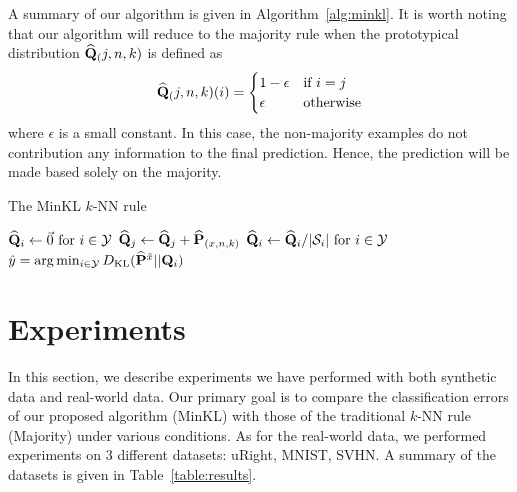 \documentclass{article}
\begin{document}
A summary of our algorithm is given in Algorithm~\ref{alg:minkl}.
It is worth noting that our algorithm will reduce to the majority
rule when the prototypical distribution
$\widehat{\mathbf{Q}}_(j,n,k)$ is defined as 
\[
\widehat{\mathbf{Q}}_(j,n,k)(i) = \begin{cases} 1-\epsilon &\mbox{if } i = j \\ 
\epsilon & \mbox{otherwise} \end{cases}
\]
where $\epsilon$ is a small constant. In this case, the non-majority
examples do not contribution any information to the final
prediction. Hence, the prediction will be made based solely on the
majority.

\begin{algorithm}
\caption{The MinKL $k$-NN rule}
\label{alg:minkl}
\begin{algorithmic}[1]
\STATE $\widehat{\mathbf{Q}}_i \leftarrow \vec{0} \mbox{ for } i \in \mathcal{Y}$
\STATE $\widehat{\mathbf{Q}}_j \leftarrow \widehat{\mathbf{Q}}_j + \widehat{\mathbf{P}}_{(x,n,k)}$
\ENDFOR
\STATE $\widehat{\mathbf{Q}}_i \leftarrow \widehat{\mathbf{Q}}_i / |\mathcal{S}_i| \mbox{ for } i \in \mathcal{Y}$
\STATE $\hat{y} = \arg\min_{i \in \mathcal{Y}} D_{\mathrm{KL}}(\widehat{\mathbf{P}}^{\tilde{x}} || \mathbf{Q}_i)$
\end{algorithmic}
\end{algorithm}

\section{Experiments}

In this section, we describe experiments we have performed with both
synthetic data and real-world data. Our primary goal is to compare the
classification errors of our proposed algorithm (MinKL) with those of
the traditional $k$-NN rule (Majority) under various conditions.  As
for the real-world data, we performed experiments on 3 different
datasets: uRight, MNIST, SVHN.  A summary of the datasets is given in
Table~\ref{table:results}.
\end{document}
